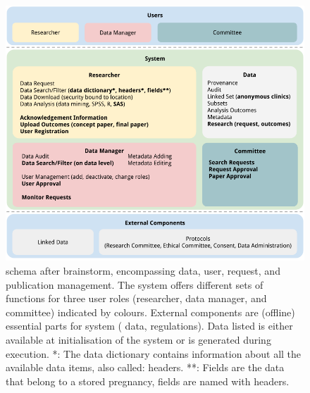 \begin{figure}[!h]
	\centering
	\includegraphics[width=0.98\linewidth]{images/brainstorm-after}
	\caption{
		\ivfsystem{} schema after brainstorm, encompassing data, user, request, and publication management.
		The system offers different sets of functions for three user roles (researcher, data manager, and committee) indicated by colours. 
		External components are (offline) essential parts for system (\eg{} data, regulations).
		Data listed is either available at initialisation of the system or is generated during execution.
		*: The data dictionary contains information about all the available data items, also called: headers.
		**: Fields are the data that belong to a stored pregnancy, fields are named with headers.
	}
	\label{fig:brainstorm-after}
\end{figure}